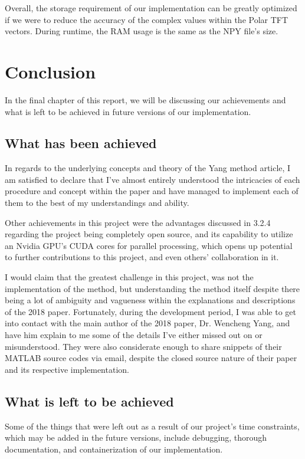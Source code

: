 \documentclass[fyp]{socreport}
\begin{document}
Overall, the storage requirement of our implementation can be greatly optimized if we were to reduce the accuracy of the complex values within the Polar TFT vectors. During runtime, the RAM usage is the same as the NPY file's size.
\chapter{Conclusion}
In the final chapter of this report, we will be discussing our achievements and what is left to be achieved in future versions of our implementation.

\section{What has been achieved}
In regards to the underlying concepts and theory of the Yang method article, I am satisfied to declare that I've almost entirely understood the intricacies of each procedure and concept within the paper and have managed to implement each of them to the best of my understandings and ability.

Other achievements in this project were the advantages discussed in 3.2.4 regarding the project being completely open source, and its capability to utilize an Nvidia GPU's CUDA cores for parallel processing, which opens up potential to further contributions to this project, and even others' collaboration in it.

I would claim that the greatest challenge in this project, was not the implementation of the method, but understanding the method itself despite there being a lot of ambiguity and vagueness within the explanations and descriptions of the 2018 paper. Fortunately, during the development period, I was able to get into contact with the main author of the 2018 paper, Dr. Wencheng Yang, and have him explain to me some of the details I've either missed out on or misunderstood. They were also considerate enough to share snippets of their MATLAB source codes via email, despite the closed source nature of their paper and its respective implementation.

\section{What is left to be achieved}
Some of the things that were left out as a result of our project's time constraints, which may be added in the future versions, include debugging, thorough documentation, and containerization of our implementation. 
\end{document}
